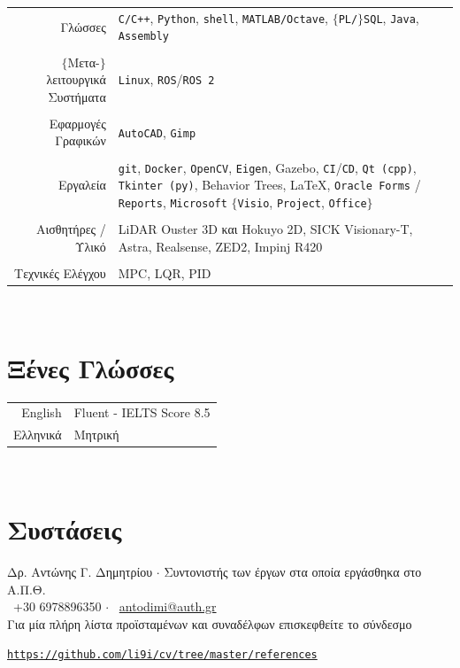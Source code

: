 \documentclass[a4paper,10pt,twoside]{article}
\begin{document}
\begin{tabular}{rp{9cm}}
  Γλώσσες & \texttt{C/C++}, \texttt{Python}, \texttt{shell}, \texttt{MATLAB/Octave}, $\{$\texttt{PL/}$\}$\texttt{SQL}, \texttt{Java}, \texttt{Assembly}\\
&\\
  $\{$Μετα-$\}$λειτουργικά Συστήματα& \texttt{Linux}, \texttt{ROS}/\texttt{ROS 2} \\
&\\
  Εφαρμογές Γραφικών & \texttt{AutoCAD}, \texttt{Gimp}\\
&\\
  Εργαλεία & \texttt{git}, \texttt{Docker}, \texttt{OpenCV}, \texttt{Eigen}, Gazebo, \texttt{CI}/\texttt{CD}, \texttt{Qt (cpp)}, \texttt{Tkinter (py)}, Behavior Trees, \LaTeX, \texttt{Oracle Forms} / \texttt{Reports}, \texttt{Microsoft} $\{$\texttt{Visio}, \texttt{Project}, \texttt{Office}$\}$ \\
&\\
  Αισθητήρες / Υλικό & LiDAR Ouster 3D και Hokuyo 2D, SICK Visionary-T, Astra, Realsense, ZED2, Impinj R420 \\
&\\
  Τεχνικές Ελέγχου & MPC, LQR, PID
\end{tabular}\\


\section{Ξένες Γλώσσες}

\begin{tabular}{rp{12cm}}
English & Fluent - IELTS Score 8.5\\
Ελληνικά & Μητρική
\end{tabular}\\

\section{Συστάσεις}
\noindent Δρ. Αντώνης Γ. Δημητρίου $\cdot$ Συντονιστής των έργων στα οποία εργάσθηκα στο Α.Π.Θ. \\
\faPhone \ +30 6978896350 $\cdot$ \faEnvelopeO \ \href{mailto:antodimi@auth.gr}{antodimi@auth.gr} \\

\noindent Για μία πλήρη λίστα προϊσταμένων και συναδέλφων επισκεφθείτε το σύνδεσμο
\begin{center}\noindent
\href{https://github.com/li9i/cv/tree/master/references}{\texttt{https://github.com/li9i/cv/tree/master/references}}
\end{center}

\vspace*{\fill}
\end{document}
